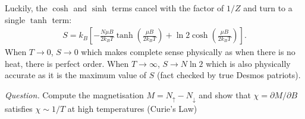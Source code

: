 \documentclass[11pt]{article}
\begin{document}
Luckily, the $\cosh$ and $\sinh$ terms cancel with the factor of $1/Z$ and turn to a single $\tanh$ term:
\begin{equation}
    \begin{aligned}
        S = k_B\left[-\frac{N\mu B}{2k_BT} \tanh\left(\frac{\mu B}{2 k_BT}\right) + \ln 2 \cosh{\left(\frac{\mu B}{2 k_BT}\right)}\right].
    \end{aligned}
\end{equation}
When $T \to 0$, $S\to 0$ which makes complete sense physically as when there is no heat, there is perfect order. When $T\to \infty$, $S \to N \ln2$ which is also physically accurate as it is the maximum value of $S$ (fact checked by true Desmos patriots).

\textit{Question.} Compute the magnetisation $M=N_{\uparrow} - N_{\downarrow}$ and show that $\chi = \partial M / \partial B$ satisfies $\chi \sim 1/T$ at high temperatures (Curie's Law) 
\end{document}
